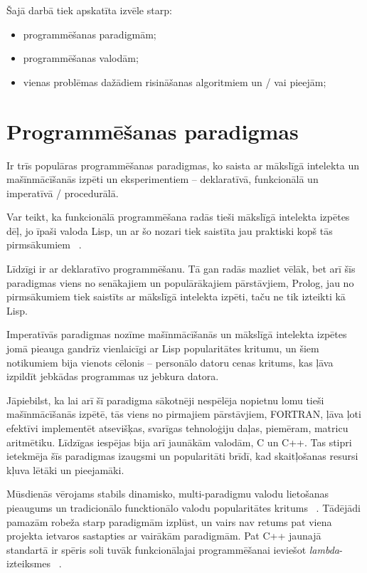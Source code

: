 \documentclass{ludis}
\begin{document}
Šajā darbā tiek apskatīta izvēle starp:
\begin{itemize}
\item programmēšanas paradigmām;
\item programmēšanas valodām;
\item vienas problēmas dažādiem risināšanas algoritmiem un / vai pieejām;
\end{itemize}

\section{Programmēšanas paradigmas} \label{sec:paradigms}
Ir trīs populāras programmēšanas paradigmas, ko saista ar mākslīgā intelekta un mašīnmācīšanās izpēti un eksperimentiem -- deklaratīvā, funkcionālā un imperatīvā / procedurālā. 

Var teikt, ka funkcionālā programmēšana radās tieši mākslīgā intelekta izpētes dēļ, jo īpaši valoda Lisp, un ar šo nozari tiek saistīta jau praktiski kopš tās pirmsākumiem ~\cite{hist_lisp}. 

Līdzīgi ir ar deklaratīvo programmēšanu. Tā gan radās mazliet vēlāk, bet arī šīs paradigmas viens no senākajiem un populārākajiem pārstāvjiem, Prolog, jau no pirmsākumiem tiek saistīts ar mākslīgā intelekta izpēti, taču ne tik izteikti kā Lisp.

Imperatīvās paradigmas nozīme mašīnmācīšanās un mākslīgā intelekta izpētes jomā pieauga gandrīz vienlaicīgi ar Lisp popularitātes kritumu, un šiem notikumiem bija vienots cēlonis -- personālo datoru cenas kritums, kas ļāva izpildīt jebkādas programmas uz jebkura datora. 

Jāpiebilst, ka lai arī šī paradigma sākotnēji nespēlēja nopietnu lomu tieši mašīnmācīšanās izpētē, tās viens no pirmajiem pārstāvjiem, FORTRAN, ļāva ļoti efektīvi implementēt atsevišķas, svarīgas tehnoloģiju daļas, piemēram, matricu aritmētiku. Līdzīgas iespējas bija arī jaunākām valodām, C un C++. Tas stipri ietekmēja šīs paradigmas izaugsmi un popularitāti brīdī, kad skaitļošanas resursi kļuva lētāki un pieejamāki.

Mūsdienās vērojams stabils dinamisko, multi-paradigmu valodu lietošanas pieaugums un tradicionālo funcktionālo valodu popularitātes kritums ~\cite{tiobe_index}. Tādējādi pamazām robeža starp paradigmām izplūst, un vairs nav retums pat viena projekta ietvaros sastapties ar vairākām paradigmām. Pat C++ jaunajā standartā ir spēris soli tuvāk funkcionālajai programmēšanai ieviešot {\em lambda}-izteiksmes ~\cite{iso_cpp11}.
\end{document}
